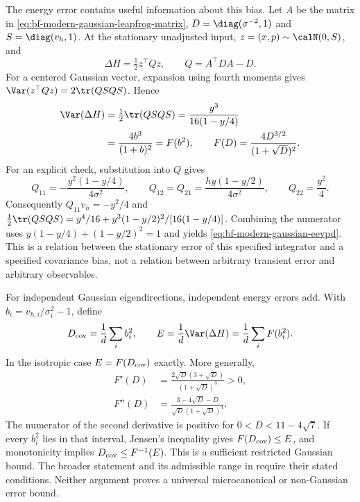 The energy error contains useful information about this bias. Let $A$ be the
matrix in \eqref{eq:bf-modern-gaussian-leapfrog-matrix},
$D=\diag(\sigma^{-2},1)$ and $S=\diag(v_h,1)$. At the stationary
unadjusted input, $z=(x,p)\sim\calN(0,S)$, and
\begin{equation}
 \Delta H=\tfrac12 z^\top Qz,\qquad Q=A^\top D A-D.
 \label{eq:bf-modern-gaussian-error-quadratic}
\end{equation}
For a centered Gaussian vector, expansion using fourth moments gives
$\Var(z^\top Qz)=2\tr(QSQS)$. Hence
\begin{align}
 \Var(\Delta H)&=\tfrac12\tr(QSQS)
          =\frac{y^3}{16(1-y/4)}\\
 &=\frac{4b^3}{(1+b)^2}
   =F(b^2),\qquad F(D)=\frac{4D^{3/2}}{(1+\sqrt D)^2}.
 \label{eq:bf-modern-gaussian-eevpd}
\end{align}
For an explicit check, substitution into $Q$ gives
\begin{equation}
 Q_{11}=-\frac{y^2(1-y/4)}{4\sigma^2},\qquad
 Q_{12}=Q_{21}=\frac{hy(1-y/2)}{4\sigma^2},\qquad
 Q_{22}=\frac{y^2}{4}.
 \label{eq:bf-modern-gaussian-error-entries}
\end{equation}
Consequently $Q_{11}v_h=-y^2/4$ and
$\tfrac12\tr(QSQS)=y^4/16+
y^3(1-y/2)^2/[16(1-y/4)]$. Combining the numerator uses
$y(1-y/4)+(1-y/2)^2=1$ and yields
\eqref{eq:bf-modern-gaussian-eevpd}. This is a relation between the
stationary error of this specified integrator and a specified covariance
bias, not a relation between arbitrary transient error and arbitrary
observables.

For independent Gaussian eigendirections, independent energy errors add.
With $b_i=v_{h,i}/\sigma_i^2-1$, define
\begin{equation}
 D_{\rm cov}=\frac1d\sum_i b_i^2,\qquad
 E=\frac1d\Var(\Delta H)=\frac1d\sum_i F(b_i^2).
 \label{eq:bf-modern-eevpd-multivariate}
\end{equation}
In the isotropic case $E=F(D_{\rm cov})$ exactly. More generally,
\begin{align}
 F'(D)&=\frac{2\sqrt D(3+\sqrt D)}{(1+\sqrt D)^3}>0,\\
 F''(D)&=\frac{3-4\sqrt D-D}{\sqrt D(1+\sqrt D)^4}.
 \label{eq:bf-modern-bias-function-derivatives}
\end{align}
The numerator of the second derivative is positive for
$0<D<11-4\sqrt7$. If every $b_i^2$ lies in that interval, Jensen's
inequality gives $F(D_{\rm cov})\leq E$, and monotonicity implies
$D_{\rm cov}\leq F^{-1}(E)$. This is a sufficient restricted Gaussian
bound. The broader statement and its admissible range in
\citet[Theorem 4.2 and Appendix B]{robnik2026unadjusted} require their
stated conditions. Neither argument proves a universal microcanonical or
non-Gaussian error bound.

